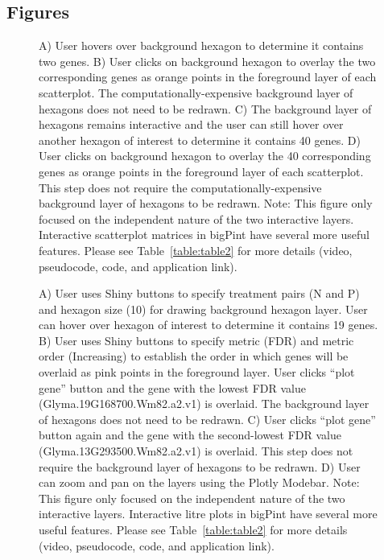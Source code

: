 \documentclass[parskip=full]{bmcart}
\begin{document}
\begin{backmatter}
\section*{Figures}
\begin{figure}[h!]
\caption{
A) User hovers over background hexagon to determine it contains two genes. B) User clicks on background hexagon to overlay the two corresponding genes as orange points in the foreground layer of each scatterplot. The computationally-expensive background layer of hexagons does not need to be redrawn. C) The background layer of hexagons remains interactive and the user can still hover over another hexagon of interest to determine it contains 40 genes. D) User clicks on background hexagon to overlay the 40 corresponding genes as orange points in the foreground layer of each scatterplot. This step does not require the computationally-expensive background layer of hexagons to be redrawn. Note: This figure only focused on the independent nature of the two interactive layers. Interactive scatterplot matrices in bigPint have several more useful features. Please see Table~\ref{table:table2} for more details (video, pseudocode, code, and application link).}
\label{figureSM}
\end{figure}

\begin{figure}[h!]
\caption{
A) User uses Shiny buttons to specify treatment pairs (N and P) and hexagon size (10) for drawing background hexagon layer. User can hover over hexagon of interest to determine it contains 19 genes. B) User uses Shiny buttons to specify metric (FDR) and metric order (Increasing) to establish the order in which genes will be overlaid as pink points in the foreground layer. User clicks “plot gene” button and the gene with the lowest FDR value (Glyma.19G168700.Wm82.a2.v1) is overlaid. The background layer of hexagons does not need to be redrawn. C) User clicks “plot gene” button again and the gene with the second-lowest FDR value (Glyma.13G293500.Wm82.a2.v1) is overlaid. This step does not require the background layer of hexagons to be redrawn. D) User can zoom and pan on the layers using the Plotly Modebar. Note: This figure only focused on the independent nature of the two interactive layers. Interactive litre plots in bigPint have several more useful features. Please see Table~\ref{table:table2} for more details (video, pseudocode, code, and application link).}
\label{figureLitre}
\end{figure}


\end{backmatter}
\end{document}
